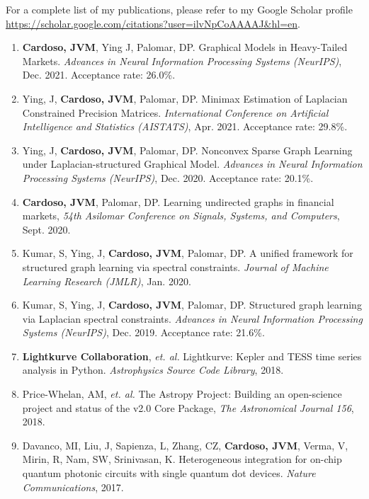 \documentclass[10pt]{article}
\begin{document}
\begin{titlepage}
{\small For a complete list of my publications, please refer to my Google Scholar profile \url{https://scholar.google.com/citations?user=ilvNpCoAAAAJ&hl=en}.}
\begin{enumerate}
  \item \textbf{Cardoso, JVM}, Ying J, Palomar, DP. Graphical Models in Heavy-Tailed Markets.
  \textit{Advances in Neural Information Processing Systems (NeurIPS)}, Dec. 2021. Acceptance rate: 26.0\%.
  \item Ying, J, \textbf{Cardoso, JVM}, Palomar, DP. Minimax Estimation of Laplacian Constrained Precision Matrices.
    \textit{International Conference on Artificial Intelligence and Statistics (AISTATS)}, Apr. 2021. Acceptance rate: 29.8\%.
  \item Ying, J, \textbf{Cardoso, JVM}, Palomar, DP. Nonconvex Sparse Graph Learning under Laplacian-structured Graphical Model.
  \textit{Advances in Neural Information Processing Systems (NeurIPS)}, Dec. 2020. Acceptance rate: 20.1\%.
  \item \textbf{Cardoso, JVM}, Palomar, DP. Learning undirected graphs in financial markets, \textit{54th Asilomar Conference on Signals, Systems, and Computers}, Sept. 2020.
  \item Kumar, S, Ying, J, \textbf{Cardoso, JVM}, Palomar, DP. A unified framework for structured graph
    learning via spectral constraints. \textit{Journal of Machine Learning Research (JMLR)}, Jan. 2020.
  \item Kumar, S, Ying, J, \textbf{Cardoso, JVM}, Palomar, DP. Structured graph learning via Laplacian
    spectral constraints. \textit{Advances in Neural Information Processing Systems (NeurIPS)}, Dec. 2019. Acceptance rate: 21.6\%.
  \item \textbf{Lightkurve Collaboration}, \textit{et. al.} Lightkurve: Kepler and TESS time series analysis in Python. \textit{Astrophysics Source Code Library}, 2018.
  \item Price-Whelan, AM, \textit{et. al.} The Astropy Project: Building an open-science project and status of the v2.0 Core Package, \textit{The Astronomical Journal 156}, 2018.
\item Davanco, MI, Liu, J, Sapienza, L, Zhang, CZ, \textbf{Cardoso, JVM}, Verma, V, Mirin, R, Nam,
SW, Srinivasan, K. Heterogeneous integration for on-chip quantum photonic circuits with single quantum dot devices.
\textit{Nature Communications}, 2017.
\end{enumerate}



\end{titlepage}
\end{document}
